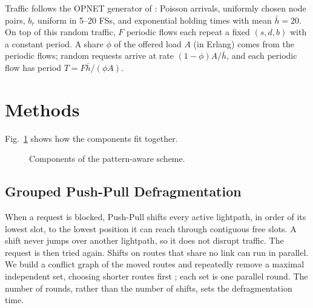 \documentclass[conference]{IEEEtran}
\begin{document}
Traffic follows the OPNET generator of \cite{malayeri2022}: Poisson arrivals, uniformly chosen node pairs, $b_r$ uniform in 5--20 FSs, and exponential holding times with mean $\bar{h}=20$. On top of this random traffic, $F$ periodic flows each repeat a fixed $(s,d,b)$ with a constant period. A share $\phi$ of the offered load $A$ (in Erlang) comes from the periodic flows; random requests arrive at rate $(1-\phi)A/\bar{h}$, and each periodic flow has period $T = F\bar{h}/(\phi A)$.

\section{Methods}\label{sec:method}
Fig.~\ref{fig:pipeline} shows how the components fit together.

\begin{figure}[t]
\centering
{}
\caption{Components of the pattern-aware scheme.}
\label{fig:pipeline}
\end{figure}

\subsection{Grouped Push-Pull Defragmentation}
When a request is blocked, Push-Pull \cite{cugini2013} shifts every active lightpath, in order of its lowest slot, to the lowest position it can reach through contiguous free slots. A shift never jumps over another lightpath, so it does not disrupt traffic. The request is then tried again. Shifts on routes that share no link can run in parallel. We build a conflict graph of the moved routes and repeatedly remove a maximal independent set, choosing shorter routes first \cite{shakya2013}; each set is one parallel round. The number of rounds, rather than the number of shifts, sets the defragmentation time.
\end{document}
